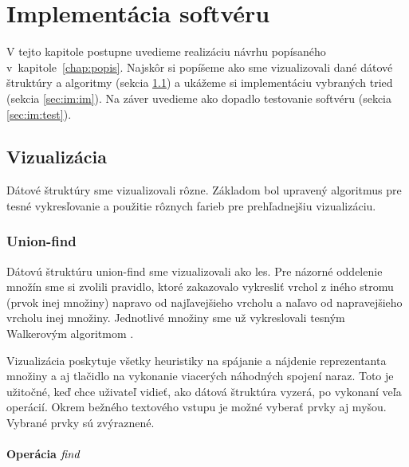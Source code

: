 \chapter{Implementácia softvéru}\label{chap:implementacia}

V tejto kapitole postupne uvedieme realizáciu návrhu popísaného 
v~kapitole~\ref{chap:popis}. Najskôr si popíšeme ako sme vizualizovali dané 
dátové štruktúry a algoritmy (sekcia \ref{sec:im:vis}) a ukážeme si 
implementáciu vybraných tried (sekcia \ref{sec:im:im}). 
Na záver uvedieme ako dopadlo testovanie softvéru (sekcia \ref{sec:im:test}).

\section{Vizualizácia}\label{sec:im:vis}

Dátové štruktúry sme vizualizovali rôzne. Základom bol upravený algoritmus pre 
tesné vykresľovanie a použitie rôznych farieb pre prehľadnejšiu vizualizáciu.

\subsection{Union-find}

Dátovú štruktúru union-find sme vizualizovali ako les. Pre názorné 
oddelenie množín sme si zvolili pravidlo, ktoré zakazovalo vykresliť vrchol 
z iného stromu (prvok inej množiny) 
napravo od najľavejšieho vrcholu a naľavo od napravejšieho vrcholu inej 
množiny. Jednotlivé množiny sme už vykreslovali tesným Walkerovým algoritmom 
\citep{walker}. 

Vizualizácia poskytuje všetky heuristiky na spájanie a 
nájdenie reprezentanta množiny a 
aj tlačidlo na vykonanie viacerých náhodných spojení naraz. Toto je užitočné, 
keď chce uživateľ vidieť, ako dátová štruktúra vyzerá, po vykonaní 
veľa operácií. Okrem bežného textového vstupu je možné vyberať prvky aj myšou. 
Vybrané prvky sú zvýraznené.

\subsubsection{Operácia $\mathop{\mathit{find}}$}

